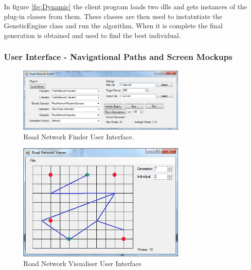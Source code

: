 In figure \ref{fig:Dynamic} the client program loads two dlls and gets instances of the plug-in classes from them. These classes are then used to instatntiate the GeneticEngine class and run the algorithm. When it is complete the final generation is obtained and used to find the best individual.

\clearpage

\subsubsection{User Interface - Navigational Paths and Screen Mockups}
\begin{figure}[ht!]
 \caption{Road Network Finder User Interface.}
 \centering
 \includegraphics[width=0.75\textwidth]{../Finder.png}
\end{figure}

\begin{figure}[ht!]
 \caption{Road Network Visualiser User Interface}
 \centering
 \includegraphics[width=0.75\textwidth]{../Visualiser.png}
\end{figure}

\clearpage



